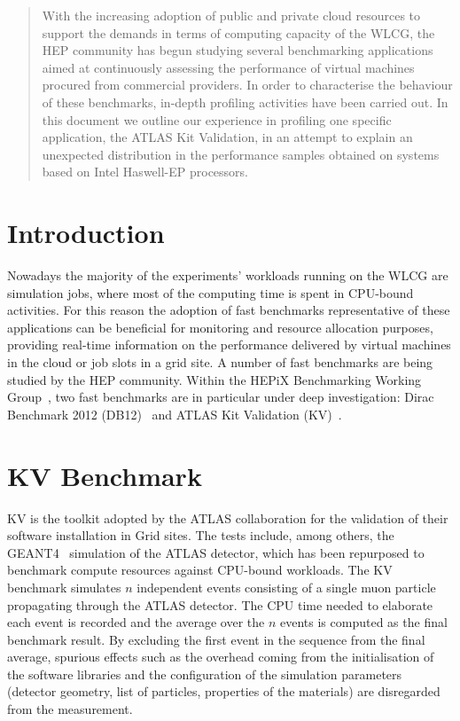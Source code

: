 \begin{abstract}
With the increasing adoption of public and private cloud resources to support
the demands in terms of computing capacity of the WLCG, the HEP community has begun
studying several benchmarking applications aimed at continuously assessing the
performance of virtual machines procured from commercial providers.
In order to characterise the behaviour of these benchmarks, in-depth
profiling activities have been carried out. In this document we outline
our experience in profiling one specific application, the ATLAS Kit Validation,
in an attempt to explain an unexpected distribution in the performance samples
obtained on systems based on Intel Haswell-EP processors.
\end{abstract}


\section{Introduction}
Nowadays the majority of the experiments' workloads running on the WLCG are simulation 
jobs, where most of the computing time is spent in CPU-bound activities. For this 
reason the adoption of fast benchmarks representative of these applications
can be beneficial for monitoring and resource allocation purposes,
providing real-time information on the performance delivered by virtual 
machines in the cloud or job slots in a grid site.
A number of fast benchmarks are being studied by the HEP community. Within the 
HEPiX Benchmarking Working Group~\cite{HEPiX:2014:HEPiX}, two fast benchmarks are 
in particular under deep investigation: Dirac Benchmark 2012 (DB12)~\cite{CERN:2016:DB12} 
and ATLAS Kit Validation (KV)~\cite{KV}.

\section{KV Benchmark}
KV is the toolkit adopted by the ATLAS collaboration for the
validation of their software installation in Grid sites. The tests include, among
others, the GEANT4~\cite{GEANT4} simulation of the ATLAS detector, which
has been repurposed to benchmark compute resources against CPU-bound 
workloads. The KV benchmark simulates $n$ independent events consisting of a single muon particle 
propagating through the ATLAS detector. The CPU time needed to elaborate each event 
is recorded and the average over the $n$ events is computed as the final benchmark result.
By excluding the first event in the sequence from the final average, spurious effects such as the 
overhead coming from the initialisation of the software libraries and the configuration 
of the simulation parameters (detector geometry, list of particles, properties of 
the materials) are disregarded from the measurement.

